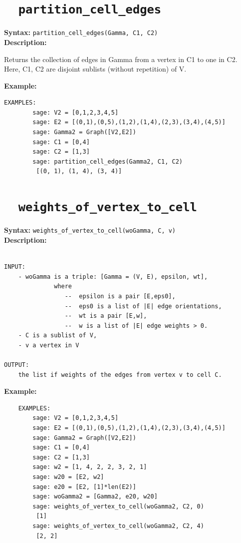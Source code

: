 \documentclass{article}
\begin{document}
\section{\tt \ \ partition\_cell\_edges}

\textbf{Syntax:} \verb}partition_cell_edges(Gamma, C1, C2)}\\

\textbf{Description:}

Returns the collection of edges in Gamma from a vertex in C1 to one in C2.
    Here, C1, C2 are disjoint sublists (without repetition) of V.

\textbf{Example:}
\begin{verbatim}
EXAMPLES:
        sage: V2 = [0,1,2,3,4,5]
        sage: E2 = [(0,1),(0,5),(1,2),(1,4),(2,3),(3,4),(4,5)]
        sage: Gamma2 = Graph([V2,E2])
        sage: C1 = [0,4]
        sage: C2 = [1,3]
        sage: partition_cell_edges(Gamma2, C1, C2)
         [(0, 1), (1, 4), (3, 4)]
\end{verbatim}

\section{\tt \ \ weights\_of\_vertex\_to\_cell}

\textbf{Syntax:} \verb}weights_of_vertex_to_cell(woGamma, C, v)}\\

\textbf{Description:}
\begin{verbatim}

INPUT:
    - woGamma is a triple: [Gamma = (V, E), epsilon, wt], 
              where 
                 --  epsilon is a pair [E,eps0], 
                 --  eps0 is a list of |E| edge orientations,
                 --  wt is a pair [E,w],   
                 --  w is a list of |E| edge weights > 0.
    - C is a sublist of V,
    - v a vertex in V

OUTPUT:
    the list if weights of the edges from vertex v to cell C.
\end{verbatim}

\textbf{Example:}
\begin{verbatim}
    EXAMPLES:
        sage: V2 = [0,1,2,3,4,5]
        sage: E2 = [(0,1),(0,5),(1,2),(1,4),(2,3),(3,4),(4,5)]
        sage: Gamma2 = Graph([V2,E2])
        sage: C1 = [0,4]
        sage: C2 = [1,3]
        sage: w2 = [1, 4, 2, 2, 3, 2, 1]
        sage: w20 = [E2, w2]
        sage: e20 = [E2, [1]*len(E2)]
        sage: woGamma2 = [Gamma2, e20, w20]
        sage: weights_of_vertex_to_cell(woGamma2, C2, 0)
         [1]
        sage: weights_of_vertex_to_cell(woGamma2, C2, 4)
         [2, 2]
\end{verbatim}
\end{document}
